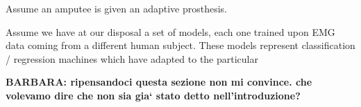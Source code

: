 Assume an amputee is given an adaptive prosthesis. 




Assume we have at our disposal a set of models, each one trained upon
EMG data coming from a different human subject. These models represent
classification / regression machines which have adapted to the
particular 

\textbf{BARBARA: ripensandoci questa sezione non mi convince. che
volevamo dire che non sia gia` stato detto nell'introduzione?}
